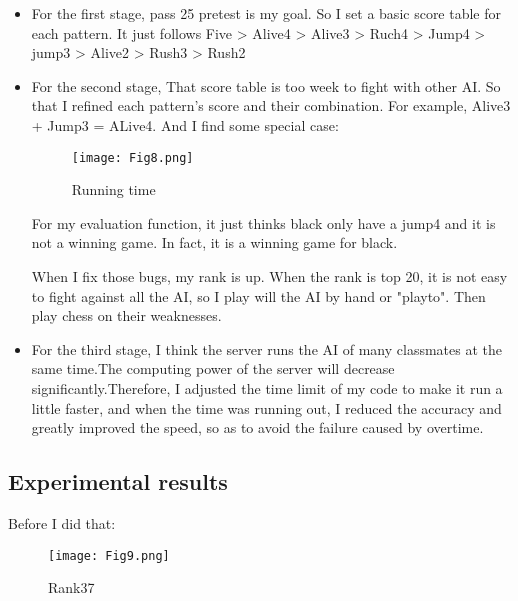 \documentclass[10pt,twocolumn,letterpaper]{article}
\begin{document}
\begin{itemize}
    \item 
    For the first stage, pass 25 pretest is my goal. So I set a basic score table for each pattern. It just follows Five > Alive4 > Alive3 > Ruch4 > Jump4 > jump3 > Alive2 > Rush3 > Rush2
\end{itemize}
\begin{itemize}
    \item 
    For the second stage, That score table is too week to fight with other AI. So that I refined each pattern's score and their combination. For example, Alive3 + Jump3 = ALive4. And I find some special case:
    
    \begin{figure}[H]
      \centering
      \texttt{[image: Fig8.png]}\\
      \caption{Running time
    }\label{straddltimeScale}
    \end{figure}
    
    For my evaluation function, it just thinks black only have a jump4 and it is not a winning game. In fact, it is a winning game for black.
    
    When I fix those bugs, my rank is up. When the rank is top 20, it is not easy to fight against all the AI, so I play will the AI by hand or "playto". Then play chess on their weaknesses.
\end{itemize}
\begin{itemize}
    \item 
    For the third stage, I think the server runs the AI of many classmates at the same time.The computing power of the server will decrease significantly.Therefore, I adjusted the time limit of my code to make it run a little faster, and when the time was running out, I reduced the accuracy and greatly improved the speed, so as to avoid the failure caused by overtime.
\end{itemize}

\subsection{Experimental results}
Before I did that:

\begin{figure}[H]
  \centering
  \texttt{[image: Fig9.png]}\\
  \caption{Rank37
}\label{straddltimeScale}
\end{figure}
\end{document}
